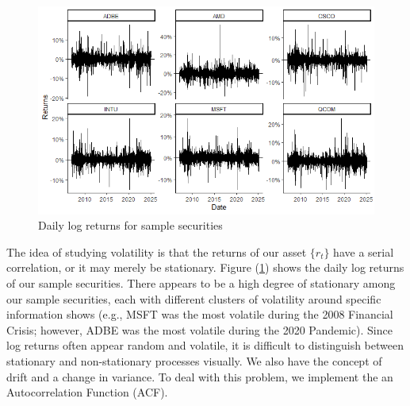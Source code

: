 \documentclass[12pt]{article}
\begin{document}
\begin{figure}[h]
	\centering
	\includegraphics[width=1\linewidth]{plots/daily_returns_alt.png}
	\caption{Daily log returns for sample securities}
	\label{fig:daily_log_returns}
\end{figure}
The idea of studying volatility is that the returns of our asset $\lbrace r_t\rbrace$ have a serial correlation, or it may merely be stationary. Figure (\ref{fig:daily_log_returns}) shows the daily log returns of our sample securities. There appears to be a high degree of stationary among our sample securities, each with different clusters of volatility around specific information shows (e.g., MSFT was the most volatile during the 2008 Financial Crisis; however, ADBE was the most volatile during the 2020 Pandemic). Since log returns often appear random and volatile, it is difficult to distinguish between stationary and non-stationary processes visually. We also have the concept of drift and a change in variance. To deal with this problem, we implement the an Autocorrelation Function (ACF).
\end{document}
